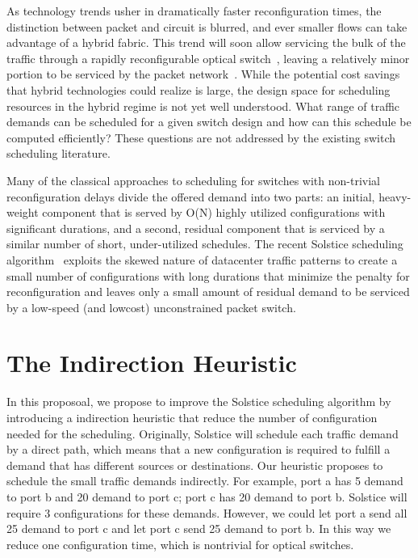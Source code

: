 As technology trends usher in dramatically faster reconfiguration times,
the distinction between packet and circuit is blurred, and ever smaller
flows can take advantage of a hybrid fabric. This trend will soon allow
servicing the bulk of the traffic through a rapidly reconfigurable
optical switch~\cite{Porter:2013}, leaving a relatively minor portion to
be serviced by the packet network~\cite{Liu:2014}. While the potential
cost savings that hybrid technologies could realize is large, the design
space for scheduling resources in the hybrid regime is not yet well
understood. What range of traffic demands can be scheduled for a given
switch design and how can this schedule be computed efficiently? These
questions are not addressed by the existing switch scheduling literature.

Many of the classical approaches to scheduling for switches with
non-trivial reconfiguration delays divide the offered demand into two
parts: an initial, heavy-weight component that is served by O(N) highly
utilized configurations with significant durations, and a second,
residual component that is serviced by a similar number of short,
under-utilized schedules. The recent Solstice scheduling algorithm~\cite{Liu:2014}
exploits the skewed nature of datacenter traffic
patterns to create a small number of configurations with long durations
that minimize the penalty for reconfiguration and leaves only a small
amount of residual demand to be serviced by a low-speed (and lowcost)
unconstrained packet switch.

\section{The Indirection Heuristic}
\label{sec:indirection}
In this proposoal, we propose to improve the Solstice scheduling
algorithm by introducing a indirection heuristic that reduce the number
of configuration needed for the scheduling. Originally, Solstice will
schedule each traffic demand by a direct path, which means that a new
configuration is required to fulfill a demand that has different sources
or destinations. Our heuristic proposes to schedule the small traffic
demands indirectly. For example, port a has 5 demand to port b and 20
demand to port c; port c has 20 demand to port b. Solstice will require
3 configurations for these demands. However, we could let port a send
all 25 demand to port c and let port c send 25 demand to port b. In this
way we reduce one configuration time, which is nontrivial for optical
switches. 

